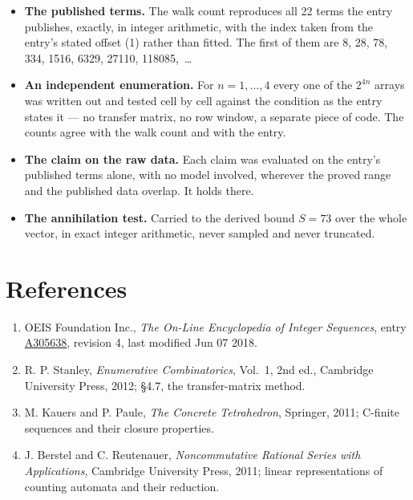 \documentclass[11pt]{article}
\theoremstyle{definition}
\begin{document}
\begin{itemize}

\item {\bfseries The published terms.} The walk count reproduces all 22 terms the entry publishes, exactly, in integer arithmetic, with the index taken from the entry's stated offset (1) rather than fitted. The first of them are 8, 28, 78, 334, 1516, 6329, 27110, 118085,~\dots

\item {\bfseries An independent enumeration.} For $n = 1,\dots,4$ every one of the $2^{4n}$ arrays was written out and tested cell by cell against the condition as the entry states it --- no transfer matrix, no row window, a separate piece of code. The counts agree with the walk count and with the entry.

\item {\bfseries The claim on the raw data.} Each claim was evaluated on the entry's published terms alone, with no model involved, wherever the proved range and the published data overlap. It holds there.

\item {\bfseries The annihilation test.} Carried to the derived bound $S = 73$ over the whole vector, in exact integer arithmetic, never sampled and never truncated.

\end{itemize}

\section{References}

\begin{enumerate}

\item OEIS Foundation Inc., \emph{The On-Line Encyclopedia of Integer Sequences}, entry \href{https://oeis.org/A305638}{A305638}, revision 4, last modified Jun 07 2018.

\item R. P. Stanley, \emph{Enumerative Combinatorics}, Vol.~1, 2nd ed., Cambridge University Press, 2012; \S4.7, the transfer-matrix method.

\item M. Kauers and P. Paule, \emph{The Concrete Tetrahedron}, Springer, 2011; C-finite sequences and their closure properties.

\item J. Berstel and C. Reutenauer, \emph{Noncommutative Rational Series with Applications}, Cambridge University Press, 2011; linear representations of counting automata and their reduction.

\end{enumerate}
\end{document}
